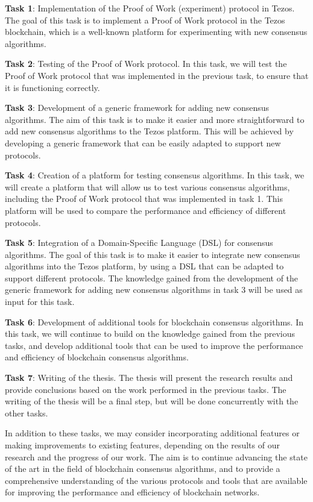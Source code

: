 \textbf{Task 1}: Implementation of the Proof of Work (experiment) protocol in Tezos. The goal of this task is to implement a Proof of Work protocol in the Tezos blockchain, which is a well-known platform for experimenting with new consensus algorithms.

\textbf{Task 2}: Testing of the Proof of Work protocol. In this task, we will test the Proof of Work protocol that was implemented in the previous task, to ensure that it is functioning correctly.

\textbf{Task 3}: Development of a generic framework for adding new consensus algorithms. The aim of this task is to make it easier and more straightforward to add new consensus algorithms to the Tezos platform. This will be achieved by developing a generic framework that can be easily adapted to support new protocols.

\textbf{Task 4}: Creation of a platform for testing consensus algorithms. In this task, we will create a platform that will allow us to test various consensus algorithms, including the Proof of Work protocol that was implemented in task 1. This platform will be used to compare the performance and efficiency of different protocols.

\textbf{Task 5}: Integration of a Domain-Specific Language (DSL) for consensus algorithms. The goal of this task is to make it easier to integrate new consensus algorithms into the Tezos platform, by using a DSL that can be adapted to support different protocols. The knowledge gained from the development of the generic framework for adding new consensus algorithms in task 3 will be used as input for this task.

\textbf{Task 6}: Development of additional tools for blockchain consensus algorithms. In this task, we will continue to build on the knowledge gained from the previous tasks, and develop additional tools that can be used to improve the performance and efficiency of blockchain consensus algorithms.

\textbf{Task 7}: Writing of the thesis. The thesis will present the research results and provide conclusions based on the work performed in the previous tasks. The writing of the thesis will be a final step, but will be done concurrently with the other tasks.

In addition to these tasks, we may consider incorporating additional features or making improvements to existing features, depending on the results of our research and the progress of our work. The aim is to continue advancing the state of the art in the field of blockchain consensus algorithms, and to provide a comprehensive understanding of the various protocols and tools that are available for improving the performance and efficiency of blockchain networks.

